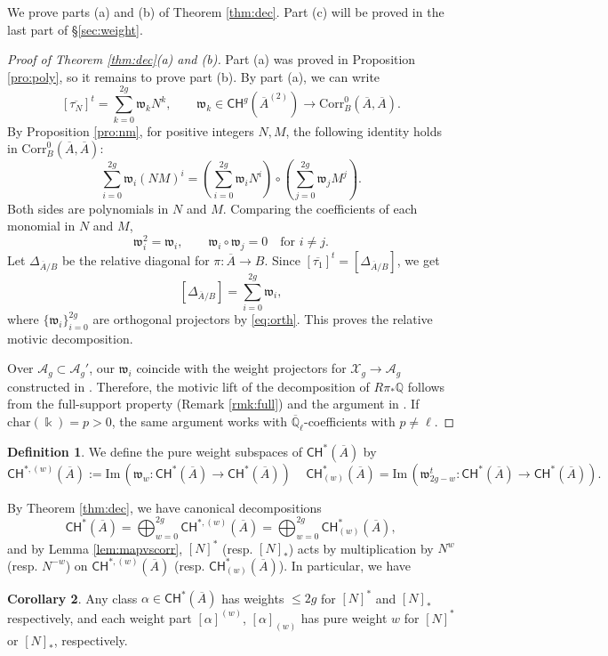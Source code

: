 \documentclass[11pt]{article}
\def\CH{\mathsf{CH}}
\def\A{\mathcal{A}}
\def\X{\mathcal{X}}
\def\QQ{\mathbb{Q}}
\def\im{\mathrm{Im}\,}
\newcommand{\barA}{\overline{A}}
\newcommand{\corr}{\mathrm{Corr}}
\newcommand{\w}{\mathfrak{w}}
\theoremstyle{definition}
\newtheorem{definition}{Definition}[section]
\newtheorem{corollary}[definition]{Corollary}
\begin{document}
We prove parts (a) and (b) of Theorem \ref{thm:dec}. Part (c) will be proved in the last part of \S\ref{sec:weight}.
\begin{proof}[Proof of Theorem \ref{thm:dec}(a) and (b)]
    Part (a) was proved in Proposition \ref{pro:poly}, so it remains to prove
    part (b). By part (a), we can write
    \[
    [\overline{\tau_N}]^t = \sum_{k=0}^{2g} \w_k N^k,
    \qquad
    \w_k \in \CH^g(\barA^{(2)}) \to \corr^0_B(\barA,\barA).
    \]
    By Proposition \ref{pro:nm}, for positive integers $N,M$, the following
    identity holds in $\corr_B^0(\barA,\barA)$:
    \begin{equation}\label{eq:orth1}
        \sum_{i=0}^{2g} \w_i (NM)^i
        =
        \left(\sum_{i=0}^{2g} \w_i N^i\right)
        \circ
        \left( \sum_{j=0}^{2g} \w_j M^j \right).
    \end{equation}
    Both sides are polynomials in $N$ and $M$. Comparing the coefficients of
    each monomial in $N$ and $M$,
    \begin{equation}\label{eq:orth}
        \w_i^2 = \w_i, \qquad \w_i \circ \w_j = 0 \quad \text{for } i \neq j.
    \end{equation}
    Let $\Delta_{\barA/B}$ be the relative diagonal for $\pi : \barA \to B$. Since $[\overline{\tau_1}]^t = [\Delta_{\barA/B}]$, we get
    \[
    [\Delta_{\barA/B}] = \sum_{i=0}^{2g} \w_i,
    \]
    where $\{\w_i\}_{i=0}^{2g}$ are orthogonal projectors by \eqref{eq:orth}.
    This proves the relative motivic decomposition.

    Over $\A_g \subset \A_g'$, our $\w_i$ coincide with the weight projectors for $\X_g \to \A_g$ constructed in \cite{DM91}. Therefore, the motivic lift of the decomposition of $R\pi_*\QQ$ follows from the full-support property (Remark \ref{rmk:full}) and the argument in \cite[\S 2.5.2]{PerverseFourierMSY25}. If $\mathrm{char} (\Bbbk) = p>0$, the same argument works with $\overline{\QQ}_\ell$-coefficients with $p \neq \ell$.
\end{proof}

\begin{definition}
    We define the pure weight subspaces of $\CH^*(\barA)$ by
    $$
    \CH^{*,(w)}(\barA) := \im \left(\mathfrak w_w : \CH^*(\barA) \to \CH^*(\barA)\right)\, \quad \CH^*_{(w)}(\barA) = \im \left(\mathfrak w_{2g-w}^t : \CH^*(\barA) \to \CH^*(\barA)\right).
    $$
\end{definition}
By Theorem \ref{thm:dec}, we have canonical decompositions
$$
\CH^*(\barA) = \bigoplus_{w=0}^{2g} \CH^{*,(w)}(\barA) = \bigoplus_{w=0}^{2g} \CH^{*}_{(w)}(\barA),
$$
and by Lemma \ref{lem:mapvscorr}, $[N]^*$ (resp. $[N]_*$) acts by multiplication by $N^w$ (resp. $N^{-w}$) on $\CH^{*,(w)}(\barA)$ (resp. $\CH^{*}_{(w)}(\barA)$). In particular, we have
\begin{corollary}\label{cor:pure}
    Any class $\alpha \in \CH^*(\barA)$ has weights $\leq 2g$ for $[N]^*$ and $[N]_*$ respectively, and each weight part $[\alpha]^{(w)}$, $[\alpha]_{(w)}$ has pure weight $w$ for $[N]^*$ or $[N]_*$, respectively.
\end{corollary}
\end{document}
